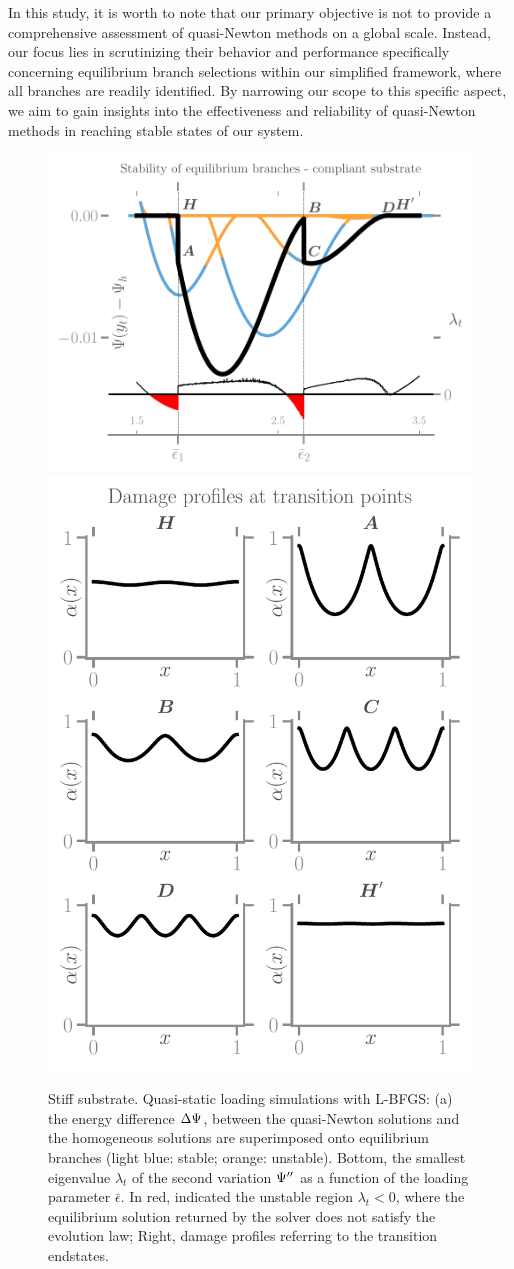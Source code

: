 In  this study, it is worth to note that our primary objective is not to provide a comprehensive assessment of quasi-Newton methods on a global scale. Instead, our focus lies in scrutinizing their behavior and performance specifically concerning equilibrium branch selections within our simplified framework, where all branches are readily identified. By narrowing our scope to this specific aspect, we aim to gain insights into the effectiveness and reliability of quasi-Newton methods in reaching stable states of our system.
\begin{figure}
    \hspace*{-3cm}
\includegraphics[width=.7\textwidth]{../images/model_stiff_energy_kick.pdf}
\includegraphics[width=.4\textwidth]{../images/model_stiff_profiles.pdf}
    \caption{
Stiff substrate. Quasi-static loading simulations with L-BFGS: (a) the energy difference $\Delta \Psi$, between the quasi-Newton solutions and the homogeneous solutions are superimposed onto equilibrium branches (light blue: stable; orange: unstable). Bottom, the smallest eigenvalue $\lambda_t$ of the second variation $\Psi''$ as a function of the loading parameter $\bar\epsilon$. In red, indicated the unstable region $\lambda_t<0$, where the equilibrium solution returned by the solver does not satisfy the evolution law; Right, damage profiles referring to the transition endstates.}
    \label{fig:tempo1}
\end{figure}

